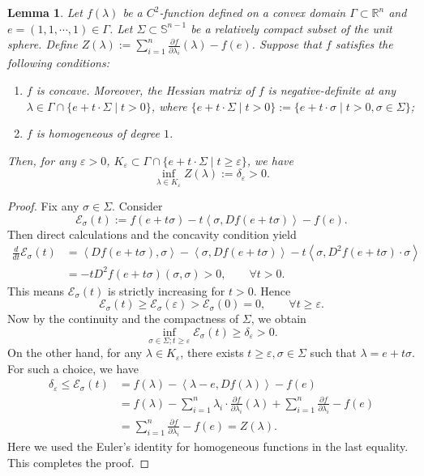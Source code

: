 \documentclass[reqno]{amsart}
\newtheorem{lemma}[theorem]{Lemma}
\theoremstyle{remark}
\newcommand{\R}{\ensuremath{\mathbb{R}}}
\newcommand{\pd}[2]{\frac{\partial {#1}}{\partial {#2}}}
\newcommand{\ip}[2]{\ensuremath{\left< {#1}, {#2} \right>}}
\newcommand{\eps}{\ensuremath{\varepsilon}}
\theoremstyle{definition}
\numberwithin{equation}{section}
\begin{document}
\begin{lemma}\label{lem:algebraic}
    Let \(f(\lambda)\) be a \(C^2\)-function defined on a convex domain \(\Gamma \subset \R^n\) and \(e = (1,1,\cdots,1) \in \Gamma\). Let \(\Sigma \subset \mathbb{S}^{n-1}\) be a relatively compact subset of the unit sphere. Define \(Z(\lambda) := \sum_{i=1}^{n}\pd{f}{\lambda_i}(\lambda) - f(e)\). Suppose that \(f\) satisfies the following conditions: 
    \begin{enumerate}
        \item \(f\) is concave. Moreover, the Hessian matrix of \(f\) is negative-definite at any \(\lambda\in \Gamma\cap\{ e+t\cdot\Sigma \mid t > 0\}\), where \(\{ e+t\cdot\Sigma \mid t > 0\} := \{ e+t\cdot\sigma \mid t > 0, \sigma\in \Sigma\}\); 
        \item \(f\) is homogeneous of degree \(1\).
    \end{enumerate}
    Then, for any \(\eps > 0\), \(K_{\eps} \subset \Gamma\cap\{ e+t\cdot\Sigma \mid t\geq \eps\}\), we have 
    \[ \inf_{\lambda \in K_{\eps}}Z(\lambda) := \delta_{\eps} > 0. \]
\end{lemma}
\begin{proof}
    Fix any \(\sigma\in \Sigma\). Consider 
    \[ \mathcal{E}_{\sigma}(t) := f(e+t\sigma) - t\ip{\sigma}{D f(e+t\sigma)} - f(e). \]
    Then direct calculations and the concavity condition yield
    \[ \begin{aligned}
        \frac{d}{dt}\mathcal{E}_{\sigma}(t) &= \ip{D f(e+t\sigma)}{\sigma} - \ip{\sigma}{Df(e+t\sigma)} - t\ip{\sigma}{D^2 f(e+t\sigma)\cdot \sigma} \\
        &= -t D^2 f(e+t\sigma)(\sigma,\sigma) > 0,\qquad \forall t>0.
    \end{aligned} \]
    This means \(\mathcal{E}_{\sigma}(t)\) is strictly increasing for \(t > 0\). Hence 
    \[ \mathcal{E}_{\sigma}(t) \geq \mathcal{E}_{\sigma}(\eps) > \mathcal{E}_{\sigma}(0) = 0,\qquad \forall t\geq \eps. \] 
    Now by the continuity and the compactness of \(\Sigma\), we obtain 
    \[ \inf_{\sigma\in \Sigma; t\geq \eps} \mathcal{E}_{\sigma}(t) \geq \delta_{\eps} > 0. \]
    On the other hand, for any \(\lambda\in K_{\eps}\), there exists \(t\geq \eps, \sigma\in \Sigma\) such that \(\lambda = e+t\sigma\). For such a choice, we have 
    \[ \begin{aligned}
        \delta_{\eps} \leq \mathcal{E}_{\sigma}(t) &= f(\lambda) - \ip{\lambda - e}{Df(\lambda)} - f(e) \\
        &= f(\lambda) - \sum_{i=1}^{n}\lambda_i\cdot \pd{f}{\lambda_i}(\lambda) + \sum_{i=1}^{n}\pd{f}{\lambda_i} - f(e) \\
        &= \sum_{i=1}^{n}\pd{f}{\lambda_i} - f(e) = Z(\lambda).
    \end{aligned}  \]
    Here we used the Euler's identity for homogeneous functions in the last equality. This completes the proof.
\end{proof}
\end{document}
